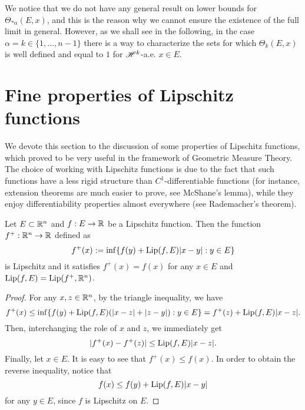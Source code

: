 We notice that we do not have any general result on lower bounds for $\Theta_{* \alpha}(E, x)$, and this is the reason why we cannot ensure the existence of the full limit in general. However, as we shall see in the following, in the case $\alpha = k \in \{1, \dots, n - 1\}$ there is a way to characterize the sets for which $\Theta_{k}(E, x)$ is well defined and equal to $1$ for $\mathscr{H}^{k}$-a.e. $x \in E$.

\section{Fine properties of Lipschitz functions}

We devote this section to the discussion of some properties of Lipschitz functions, which proved to be very useful in the framework of Geometric Measure Theory. 
The choice of working with Lipschitz functions is due to the fact that such functions have a less rigid structure than $C^{1}$-differentiable functions (for instance, extension theorems are much easier to prove, see McShane's lemma), while they enjoy differentiability properties almost everywhere (see Rademacher's theorem).

\begin{lemma} \label{McShane_lemma}
Let $E \subset \mathbb{R}^{n}$ and $f: E \to \mathbb{R}$ be a Lipschitz function. Then the function $f^{+} : \mathbb{R}^{n} \to \mathbb{R}$ defined as
\begin{equation*}
f^{+}(x) := \inf \{ f(y) + \operatorname{Lip}(f, E) |x - y| : y \in E\}
\end{equation*}
is Lipschitz and it satisfies $f^{+}(x) = f(x)$ for any $x \in E$ and $\operatorname{Lip}(f, E) = \operatorname{Lip}(f^{+}, \mathbb{R}^{n})$.
\end{lemma}
\begin{proof}
For any $x, z \in \mathbb{R}^{n}$, by the triangle inequality, we have
\begin{equation*}
f^{+}(x) \le \inf \{ f(y) + \operatorname{Lip}(f, E) (|x - z| + |z - y|) : y \in E \} = f^{+}(z) + \operatorname{Lip}(f, E) |x - z|.
\end{equation*}
Then, interchanging the role of $x$ and $z$, we immediately get
\begin{equation*}
|f^{+}(x) - f^{+}(z)| \le \operatorname{Lip}(f, E) |x - z|.
\end{equation*}
Finally, let $x \in E$. It is easy to see that $f^{+}(x) \le f(x)$. In order to obtain the reverse inequality, notice that 
\begin{equation*}
f(x) \le f(y) + \operatorname{Lip}(f, E)|x - y|
\end{equation*}
for any $y \in E$, since $f$ is Lipschitz on $E$.
\end{proof}


